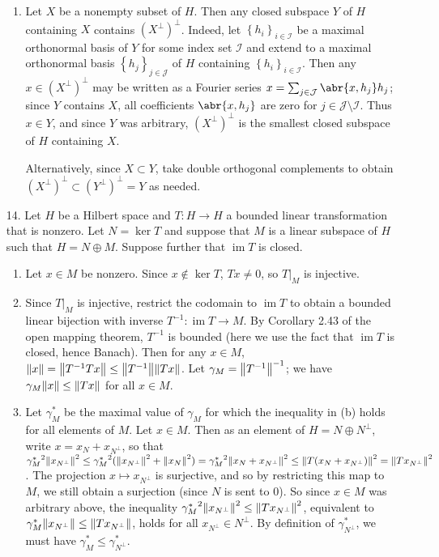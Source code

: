 \documentclass[11pt,leqno]{article}
\theoremstyle{plain}
\theoremstyle{definition}
\numberwithin{equation}{section}
\numberwithin{lem}{section}
\newcommand{\cbr}[1]{\left\{#1\right\}}
\DeclareMathOperator{\im}{im}
\begin{document}
\begin{enumerate}
\begin{enumerate}
      \item Let $X$ be a nonempty subset of $H$. Then any closed subspace $Y$ of $H$ containing $X$ contains $(X^\perp)^\perp$. Indeed, let $\cbr{h_i}_{i\in \mathcal I}$ be a maximal orthonormal basis of $Y$ for some index set $\mathcal I$ and extend to a maximal orthonormal basis $\cbr{h_j}_{j\in \mathcal J}$ of $H$ containing $\cbr{h_i}_{i\in \mathcal I}$. Then any $x\in (X^\perp)^\perp$ may be written as a Fourier series $x = \sum_{j\in \mathcal J}\abr{x,h_j}h_j$; since $Y$ contains $X$, all coefficients $\abr{x,h_j}$ are zero for $j\in \mathcal J\setminus \mathcal I$. Thus $x\in Y$, and since $Y$ was arbitrary, $(X^\perp)^\perp$ is the smallest closed subspace of $H$ containing $X$.
      
      Alternatively, since $X\subset Y$, take double orthogonal complements to obtain $(X^\perp)^\perp\subset (Y^\perp)^\perp = Y$ as needed.
    \end{enumerate}
    \item[14.] Let $H$ be a Hilbert space and $T\colon H\to H$ a bounded linear transformation that is nonzero. Let $N = \ker T$ and suppose that $M$ is a linear subspace of $H$ such that $H = N\oplus M$. Suppose further that $\im T$ is closed.
    \begin{enumerate}
      \item Let $x\in M$ be nonzero. Since $x\not\in \ker T$, $Tx\neq 0$, so $T|_M$ is injective.
      \item Since $T|_M$ is injective, restrict the codomain to $\im T$ to obtain a bounded linear bijection with inverse $T^{-1}\colon \im T\to M$. By Corollary 2.43 of the open mapping theorem, $T^{-1}$ is bounded (here we use the fact that $\im T$ is closed, hence Banach). Then for any $x\in M$, $\norm{x} = \norm{T^{-1}Tx}\leq \norm{T^{-1}}\norm{Tx}$. Let $\gamma_M = \norm{T^{-1}}^{-1}$; we have $\gamma_M\norm{x}\leq \norm{Tx}$ for all $x\in M$.
      \item Let $\gamma_M^\ast$ be the maximal value of $\gamma_M$ for which the inequality in (b) holds for all elements of $M$. Let $x\in M$. Then as an element of $H = N\oplus N^\perp$, write $x = x_N + x_{N^\perp}$, so that ${\gamma_M^\ast}^2\norm{x_{N^\perp}}^2\leq {\gamma_M^\ast}^2(\norm{x_{N^\perp}}^2 + \norm{x_N}^2) = {\gamma_M^\ast}^2\norm{x_N + x_{N^\perp}}^2\leq \norm{T(x_N + x_{N^\perp})}^2 = \norm{Tx_{N^\perp}}^2$. The projection $x\mapsto x_{N^\perp}$ is surjective, and so by restricting this map to $M$, we still obtain a surjection (since $N$ is sent to $0$). So since $x\in M$ was arbitrary above, the inequality ${\gamma_M^\ast}^2\norm{x_{N^\perp}}^2\leq\norm{Tx_{N^\perp}}^2$, equivalent to $\gamma_M^\ast\norm{x_{N^\perp}}\leq\norm{Tx_{N^\perp}}$, holds for all $x_{N^\perp}\in N^\perp$. By definition of $\gamma_{N^\perp}^\ast$, we must have $\gamma_M^\ast\leq \gamma_{N^\perp}^\ast$.
    \end{enumerate}
\end{enumerate}
\end{document}

